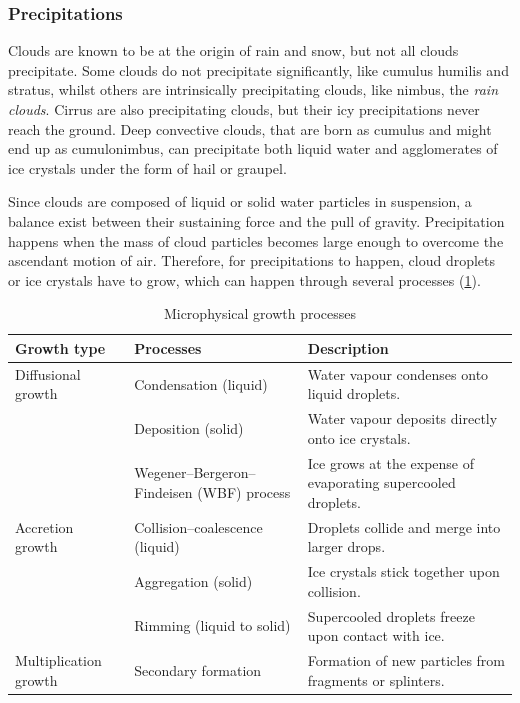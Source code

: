 

    \subsubsection{Precipitations}
    Clouds are known to be at the origin of rain and snow, but not all clouds precipitate. Some clouds do not precipitate significantly, like cumulus humilis and stratus, whilst others are intrinsically precipitating clouds, like nimbus, the \textit{rain clouds}.  %
    Cirrus are also precipitating clouds, but their icy precipitations never reach the ground. Deep convective clouds, that are born as cumulus and might end up as cumulonimbus, can precipitate both liquid water and agglomerates of ice crystals under the form of hail or graupel. %

    Since clouds are composed of liquid or solid water particles in suspension, a balance exist between their  sustaining force and the pull of gravity. Precipitation happens when the mass of cloud particles becomes large enough to overcome the ascendant motion of air.
    Therefore, for precipitations to happen, cloud droplets or ice crystals have to grow, which can happen through several processes (\cref{tab:growth_processes}).

\begin{table}[h]
    \centering
    \caption{Microphysical growth processes}
    \begin{tabular}{@{}p{3.2cm} p{4.9cm} p{7cm}@{}}
        \toprule
        \textbf{Growth type} & \textbf{Processes} & \textbf{Description} \\ \midrule
        Diffusional growth &
        Condensation (liquid) &
        Water vapour condenses onto liquid droplets. \\ 
        & Deposition (solid) &
        Water vapour deposits directly onto ice crystals. \\
        & Wegener–Bergeron–Findeisen (WBF) process &
        Ice grows at the expense of evaporating supercooled droplets. \\[0.3em]
        Accretion growth &
        Collision–coalescence (liquid) &
        Droplets collide and merge into larger drops. \\
        & Aggregation (solid) &
        Ice crystals stick together upon collision. \\
        & Rimming (liquid to solid) &
        Supercooled droplets freeze upon contact with ice. \\[0.3em]
        Multiplication growth &
        Secondary formation &
        Formation of new particles from fragments or splinters. \\
        \bottomrule
    \end{tabular}
    \label{tab:growth_processes}
\end{table}

